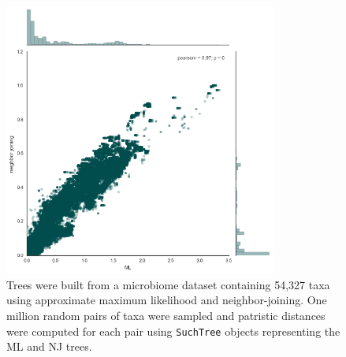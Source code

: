 \begin{figure}
    \centering
    \includegraphics[width=0.8\textwidth]{figures/nj_vs_ml}
    \caption{Trees were built from a microbiome dataset containing 54,327 taxa using approximate maximum likelihood and neighbor-joining. One million random pairs of taxa were sampled and patristic distances were computed for each pair using {\tt SuchTree} objects representing the ML and NJ trees. }
    \label{fig:nj_vs_ml}
\end{figure}
